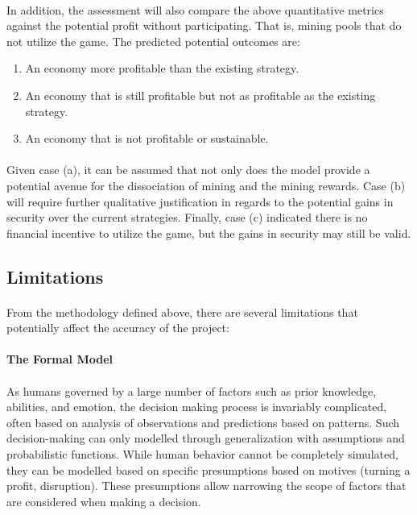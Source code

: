 \paragraph{} In addition, the assessment will also compare the above quantitative metrics against the potential profit without participating. That is, mining pools that do not utilize the game. The predicted potential outcomes are:

\renewcommand{\labelenumi}{(\alph{enumi})}
\begin{enumerate}
  \item An economy more profitable than the existing strategy. 
  \item An economy that is still profitable but not as profitable as the existing strategy.
  \item An economy that is not profitable or sustainable. %
\end{enumerate}

\paragraph{} Given case (a), it can be assumed that not only does the model provide a potential avenue for the dissociation of mining and the mining rewards. Case (b) will require further qualitative justification in regards to the potential gains in security over the current strategies. Finally, case (c) indicated there is no financial incentive to utilize the game, but the gains in security may still be valid.

\subsection{Limitations}

\paragraph{} From the methodology defined above, there are several limitations that potentially affect the accuracy of the project:

\paragraph{The Formal Model}

\paragraph{} As humans governed by a large number of factors such as prior knowledge, abilities, and emotion, the decision making process is invariably complicated, often based on analysis of observations and predictions based on patterns. Such decision-making can only modelled through generalization with assumptions and probabilistic functions. While human behavior cannot be completely simulated, they can be modelled based on specific presumptions based on motives (turning a profit, disruption). These presumptions allow narrowing the scope of factors that are considered when making a decision.

